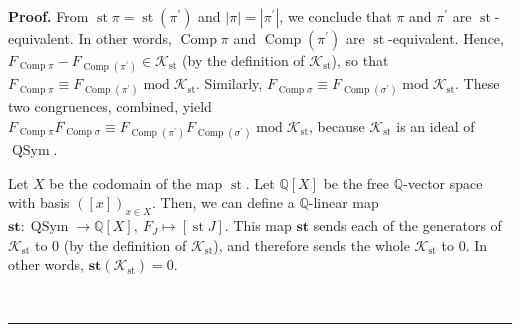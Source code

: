 \documentclass[numbers=enddot,12pt,final,onecolumn,notitlepage]{scrartcl}%
\theoremstyle{definition}
\newenvironment{proof}[1][Proof]{\noindent\textbf{#1.} }{\ \rule{0.5em}{0.5em}}
\newenvironment{verlong}{}{}
\begin{document}
\begin{verlong}
\begin{proof}
From $\operatorname{st} \pi   =\operatorname{st}\left(
\pi^{\prime}\right)  $ and $\left\vert \pi\right\vert =\left\vert \pi^{\prime
}\right\vert $, we conclude that $\pi$ and $\pi^{\prime}$ are
$\operatorname{st}$-equivalent. In other words, $\operatorname*{Comp}\pi$ and
$\operatorname*{Comp}\left(  \pi^{\prime}\right)  $ are $\operatorname{st}%
$-equivalent. Hence, $F_{\operatorname*{Comp}\pi}-F_{\operatorname*{Comp}%
\left(  \pi^{\prime}\right)  }\in\mathcal{K}_{\operatorname{st}}$ (by the
definition of $\mathcal{K}_{\operatorname{st}}$), so that
$F_{\operatorname*{Comp}\pi}\equiv F_{\operatorname*{Comp}\left(  \pi^{\prime
}\right)  }\operatorname{mod}\mathcal{K}_{\operatorname{st}}$. Similarly,
$F_{\operatorname*{Comp}\sigma}\equiv F_{\operatorname*{Comp}\left(
\sigma^{\prime}\right)  }\operatorname{mod}\mathcal{K}_{\operatorname{st}}$.
These two congruences, combined, yield $F_{\operatorname*{Comp}\pi
}F_{\operatorname*{Comp}\sigma}\equiv F_{\operatorname*{Comp}\left(
\pi^{\prime}\right)  }F_{\operatorname*{Comp}\left(  \sigma^{\prime}\right)
}\operatorname{mod}\mathcal{K}_{\operatorname{st}}$, because $\mathcal{K}%
_{\operatorname{st}}$ is an ideal of $\operatorname*{QSym}$.

Let $X$ be the codomain of the map $\operatorname{st}$. Let $\mathbb{Q}%
\left[  X\right]  $ be the free $\mathbb{Q}$-vector space with basis $\left(
\left[  x\right]  \right)  _{x\in X}$. Then, we can define a $\mathbb{Q}%
$-linear map $\mathbf{st}:\operatorname*{QSym}\rightarrow\mathbb{Q}\left[
X\right]  ,\ F_{J}\mapsto\left[  \operatorname{st}J\right]  $. This map
$\mathbf{st}$ sends each of the generators of $\mathcal{K}_{\operatorname{st}%
}$ to $0$ (by the definition of $\mathcal{K}_{\operatorname{st}}$), and
therefore sends the whole $\mathcal{K}_{\operatorname{st}}$ to $0$. In other
words, $\mathbf{st}\left(  \mathcal{K}_{\operatorname{st}}\right)  =0$.


\end{proof}
\end{verlong}
\end{document}
